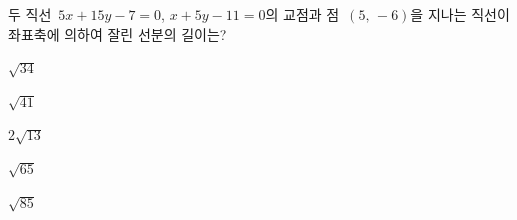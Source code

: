두 직선~$5x+15y-7=0$, $x+5y-11=0$의 교점과 점~$(5,\,-6)$을 지나는 직선이 좌표축에 의하여 잘린 선분의 길이는?
\begin{choices32}{\rule[-3ex]{0pt}{8ex}$\sqrt{34}$}{\rule[-3ex]{0pt}{8ex}$\sqrt{41}$}{\rule[-3ex]{0pt}{8ex}$2\sqrt{13}$}{\rule[-3ex]{0pt}{8ex}$\sqrt{65}$}{\rule[-3ex]{0pt}{8ex}$\sqrt{85}$}\end{choices32}
